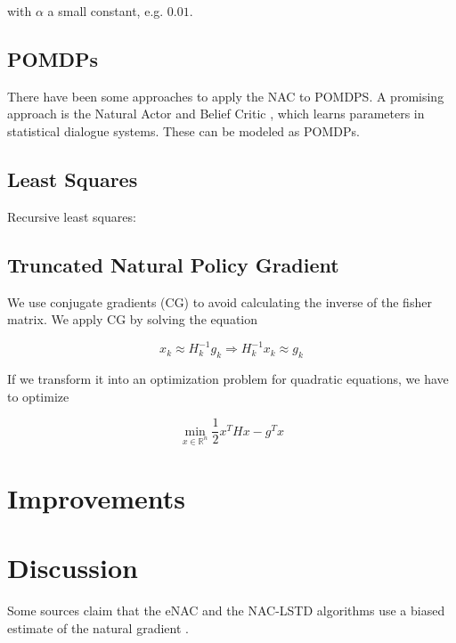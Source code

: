	\noindent with $\alpha$ a small constant, e.g. $0.01$.
	
	
	\subsection{POMDPs}
	There have been some approaches to apply the NAC to POMDPS. A promising approach is the Natural Actor and Belief Critic \cite{jurvcivcek2011natural}, which learns parameters in statistical dialogue systems. These can be modeled as POMDPs.
	
	\subsection{Least Squares}
	
	Recursive least squares: \cite{park2005rls}
	
	\subsection{Truncated Natural Policy Gradient}
	
	We use conjugate gradients (CG) to avoid calculating the inverse of the fisher matrix. We apply CG by solving the equation
	
	\begin{equation}
		x_k \approx H_k^{-1} g_k \Rightarrow H^{-1}_k x_k \approx g_k
	\end{equation}
	
	If we transform it into an optimization problem for quadratic equations, we have to optimize
	
	\begin{equation}
		\min_{x \in \mathbb{R}^n} \dfrac{1}{2} x^T H x - g^T x
	\end{equation}

\newpage
\section{Improvements}

\newpage
\section{Discussion}

Some sources claim that the eNAC and the NAC-LSTD algorithms use a biased estimate of the natural gradient \cite{thomas2014bias}.


